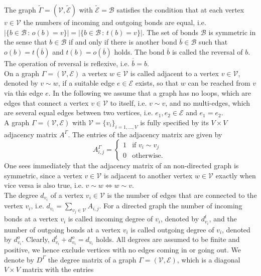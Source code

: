 The graph $\widetilde{\Gamma} = (\mathcal{V}, \widetilde{\mathcal{E}})$ with $\widetilde{\mathcal{E}} = \mathcal{B}$ satisfies the condition that at each vertex $v \in \mathcal{V}$ the numbers of incoming and outgoing bonds are equal, i.e. $\left\lvert \{ b \in \mathcal{B} \, \colon \, o(b) = v \} \right\rvert = \left\lvert \{ b \in \mathcal{B} \, \colon \, t(b) = v \} \right\rvert$. The set of bonds $\mathcal{B}$ is symmetric in the sense that $b \in \mathcal{B}$ if and only if there is another bond $\overline{b} \in \mathcal{B}$ such that $o(b) = t(\overline{b})$ and $t(b) = o(\overline{b})$ holds. The bond $\overline{b}$ is called the reversal of $b$. The operation of reversal is reflexive, i.e. $\overline{\overline{b}} = b$. \\
On a graph $\Gamma = (\mathcal{V}, \mathcal{E})$ a vertex $w \in \mathcal{V}$ is called adjacent to a vertex $v \in \mathcal{V}$, denoted by $v \sim w$, if a suitable edge $e \in \mathcal{E}$ exists, so that $w$ can be reached from $v$ via this edge $e$. In the following we assume that a graph has no loops, which are edges that connect a vertex $v \in \mathcal{V}$ to itself, i.e. $v \sim v$, and no multi-edges, which are several equal edges between two vertices, i.e. $e_1, e_2 \in \mathcal{E}$ and $e_1 = e_2$. \\
A graph $\Gamma = (\mathcal{V}, \mathcal{E})$ with $\mathcal{V} = \{v_i\}_{i = 1, \ldots, V}$ is fully specified by its $V \times V$ adjacency matrix $A^{\Gamma}$. The entries of the adjacency matrix are given by
\begin{equation}
    \label{adjacency matrix}
    A^{\Gamma}_{i, j} = \begin{cases} 1 & \text{if } v_i \sim v_j \\ 0 & \text{otherwise. } \end{cases}
\end{equation}
One sees immediately that the adjacency matrix of an non-directed graph is symmetric, since a vertex $v \in \mathcal{V}$ is adjacent to another vertex $w \in \mathcal{V}$ exactly when vice versa is also true, i.e. $v \sim w \Leftrightarrow w \sim v$. \\
The degree $d_{v_i}$ of a vertex $v_i \in \mathcal{V}$ is the number of edges that are connected to the vertex $v_i$, i.e. $d_{v_i} = \sum_{v_j \in \mathcal{V}} A_{i, j}$. For a directed graph the number of incoming bonds at a vertex $v_i$ is called incoming degree of $v_i$, denoted by $d^{t}_{v_i}$, and the number of outgoing bonds at a vertex $v_i$ is called outgoing degree of $v_i$, denoted by $d^{o}_{v_i}$. Clearly, $d^{t}_{v_i} + d^{o}_{v_i} = d_{v_i}$ holds. All degrees are assumed to be finite and positive, we hence exclude vertices with no edges coming in or going out. We denote by $D^{\Gamma}$ the degree matrix of a graph $\Gamma = (\mathcal{V}, \mathcal{E})$, which is a diagonal $V \times V$ matrix with the entries
